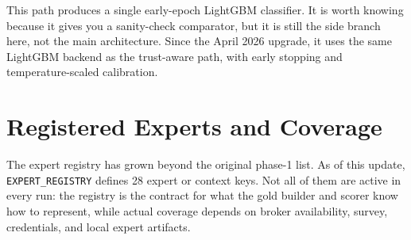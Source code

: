 \documentclass[11pt]{article}
\newcommand{\code}[1]{\texttt{#1}}
\begin{document}
This path produces a single early-epoch LightGBM classifier. It is worth knowing because it gives you a sanity-check comparator, but it is still the side branch here, not the main architecture. Since the April 2026 upgrade, it uses the same LightGBM backend as the trust-aware path, with early stopping and temperature-scaled calibration.

\section{Registered Experts and Coverage}

The expert registry has grown beyond the original phase-1 list. As of this update, \code{EXPERT\_REGISTRY} defines 28 expert or context keys. Not all of them are active in every run: the registry is the contract for what the gold builder and scorer know how to represent, while actual coverage depends on broker availability, survey, credentials, and local expert artifacts.
\end{document}
